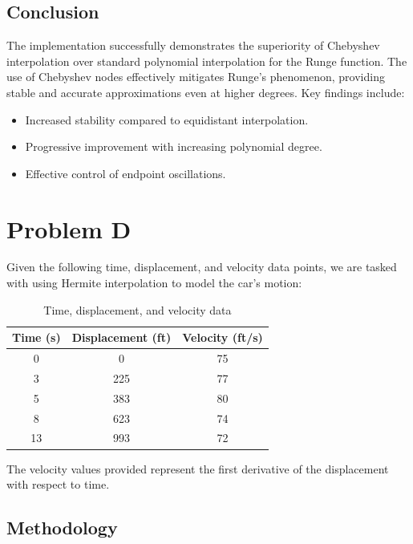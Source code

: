 \documentclass{article}
\begin{document}
\subsection{Conclusion}
The implementation successfully demonstrates the superiority of Chebyshev interpolation over standard polynomial interpolation for the Runge function. The use of Chebyshev nodes effectively mitigates Runge's phenomenon, providing stable and accurate approximations even at higher degrees.
Key findings include:
\begin{itemize}
\item Increased stability compared to equidistant interpolation.
\item Progressive improvement with increasing polynomial degree.
\item Effective control of endpoint oscillations.

\end{itemize}





\section{Problem D}
Given the following time, displacement, and velocity data points, we are tasked with using Hermite interpolation to model the car's motion:

\begin{table}[H]
    \centering
    \begin{tabular}{|c|c|c|}
        \hline
        Time (s) & Displacement (ft) & Velocity (ft/s) \\ \hline
        0        & 0                 & 75              \\
        3        & 225               & 77              \\
        5        & 383               & 80              \\
        8        & 623               & 74              \\
        13       & 993               & 72              \\ \hline
    \end{tabular}
    \caption{Time, displacement, and velocity data}
\end{table}

The velocity values provided represent the first derivative of the displacement with respect to time.

\subsection{Methodology}
\end{document}
